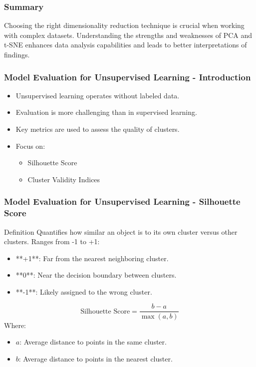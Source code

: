 \documentclass[aspectratio=169]{beamer}
\begin{document}
\begin{frame}[fragile]
    \frametitle{Summary}
    Choosing the right dimensionality reduction technique is crucial when working with complex datasets. 
    Understanding the strengths and weaknesses of PCA and t-SNE enhances data analysis capabilities and leads to better interpretations of findings.
\end{frame}

\begin{frame}[fragile]
    \frametitle{Model Evaluation for Unsupervised Learning - Introduction}
    \begin{itemize}
        \item Unsupervised learning operates without labeled data.
        \item Evaluation is more challenging than in supervised learning.
        \item Key metrics are used to assess the quality of clusters.
        \item Focus on:
        \begin{itemize}
            \item Silhouette Score
            \item Cluster Validity Indices
        \end{itemize}
    \end{itemize}
\end{frame}

\begin{frame}[fragile]
    \frametitle{Model Evaluation for Unsupervised Learning - Silhouette Score}
    \begin{block}{Definition}
        Quantifies how similar an object is to its own cluster versus other clusters. Ranges from -1 to +1:
    \end{block}
    \begin{itemize}
        \item **+1**: Far from the nearest neighboring cluster.
        \item **0**: Near the decision boundary between clusters.
        \item **-1**: Likely assigned to the wrong cluster.
    \end{itemize}
    
    \begin{equation}
        \text{Silhouette Score} = \frac{b - a}{\max(a, b)}
    \end{equation}
    Where:
    \begin{itemize}
        \item \( a \): Average distance to points in the same cluster.
        \item \( b \): Average distance to points in the nearest cluster.
    \end{itemize}
\end{frame}
\end{document}

